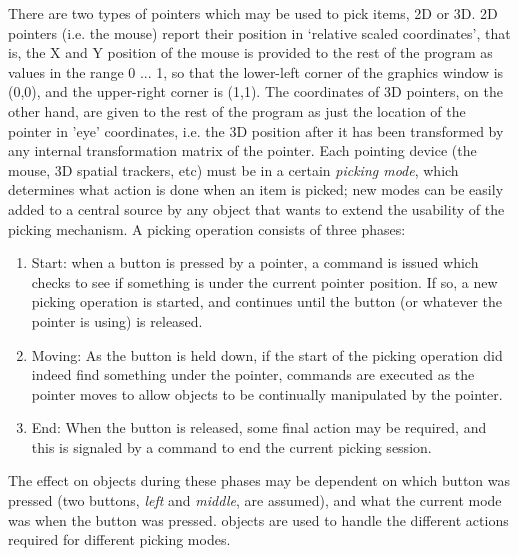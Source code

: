 There are two types of pointers which may be used to pick items, 2D or 3D.  2D pointers (i.e. the mouse) report their position in `relative scaled coordinates', that is, the X and Y position of the mouse is provided to the rest of the program as values in the range 0 ... 1, so that the lower-left corner of the graphics window is (0,0), and the upper-right corner is (1,1).  The coordinates of 3D pointers, on the other hand, are given to the rest of the program as just the location of the pointer in 'eye' coordinates, i.e. the 3D position after it has been transformed by any internal transformation matrix of the pointer.  Each pointing device (the mouse, 3D spatial trackers, etc) must be in a certain {\em picking mode}, which determines what action is done when an item is picked; new modes can be easily added to a central source by any object that wants to extend the usability of the picking mechanism.  A picking operation consists of three phases:
\begin{enumerate}
  \item Start: when a button is pressed by a pointer, a command is issued which checks to see if something is under the current pointer position.  If so, a new picking operation is started, and continues until the button (or whatever the pointer is using) is released.
  \item Moving: As the button is held down, if the start of the picking operation did indeed find something under the pointer, commands are executed as the pointer moves to allow objects to be continually manipulated by the pointer.
  \item End: When the button is released, some final action may be required, and this is signaled by a command to end the current picking session.
\end{enumerate}
The effect on objects during these phases may be dependent on which button was pressed (two buttons, {\em left} and {\em middle}, are assumed), and what the current mode was when the button was pressed.   objects are used to handle the different actions required for different picking modes.

